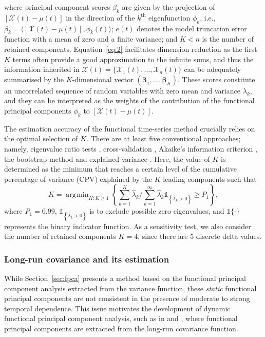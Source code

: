 \documentclass[12pt,a4paper]{article}
\newcommand{\X}{\mathcal{X}}
\DeclareMathOperator*{\argmin}{\arg\!\min}
\begin{document}
where principal component scores $\beta_k$ are given by the projection of $[\X(t) - \mu(t)]$ in the direction of the $k^{\text{th}}$ eigenfunction $\phi_k$, i.e., $\beta_k = \langle [\X(t) - \mu(t)], \phi_k(t)\rangle$; $e(t)$ denotes the model truncation error function with a mean of zero and a finite variance; and $K<n$ is the number of retained components. Equation~\eqref{eq:2} facilitates dimension reduction as the first $K$ terms often provide a good approximation to the infinite sums, and thus the information inherited in $\bm{\X}(t)=\{\X_1(t),\dots,\X_n(t)\}$ can be adequately summarised by the $K$-dimensional vector $\left(\bm{\beta}_1,\dots,\bm{\beta}_K\right)$. These scores constitute an uncorrelated sequence of random variables with zero mean and variance $\lambda_k$, and they can be interpreted as the weights of the contribution of the functional principal components $\phi_k$ to $[\X(t) - \mu(t)]$.

The estimation accuracy of the functional time-series method crucially relies on the optimal selection of $K$. There are at least five conventional approaches; namely, eigenvalue ratio tests \citep{AH13}, cross-validation \citep{RS05}, Akaike's information criterion \citep{Akaike74}, the bootstrap method \citep{HV06} and explained variance \citep{Chiou12}. Here, the value of $K$ is determined as the minimum that reaches a certain level of the cumulative percentage of variance (CPV) explained by the $K$ leading components such that
\begin{equation*}
K = \argmin_{K:K\geq 1}\left\{\sum^K_{k=1}\widehat{\lambda}_k\Bigg/\sum^{\infty}_{k=1}\widehat{\lambda}_k\mathds{1}_{\left\{\widehat{\lambda}_k>0\right\}}\geq P_1\right\}, 
\end{equation*}
where $P_1 = 0.99$, $\mathds{1}_{\left\{\widehat{\lambda}_k>0\right\}}$ is to exclude possible zero eigenvalues, and $\mathds{1}\{\cdot\}$ represents the binary indicator function. As a sensitivity test, we also consider the number of retained components $K=4$, since there are 5 discrete delta values.

\subsubsection{Long-run covariance and its estimation}\label{sec:long-run}

While Section~\ref{sec:fpca} presents a method based on the functional principal component analysis extracted from the variance function, these \textit{static} functional principal components are not consistent in the presence of moderate to strong temporal dependence. This issue motivates the development of dynamic functional principal component analysis, such as in \cite{HKH15} and \cite{RS17}, where functional principal components are extracted from the long-run covariance function.
\end{document}
